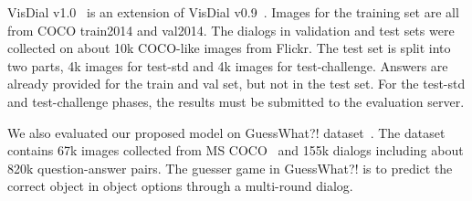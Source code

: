 \documentclass[10pt,twocolumn,letterpaper]{article}
\begin{document}
VisDial v1.0~\cite{das2017visual} is an extension of VisDial v0.9~\cite{das2017visual}. Images for the training set are all from COCO train2014 and val2014. The dialogs in validation and test sets were collected on about 10k COCO-like images from Flickr. The test set is split into two parts, 4k images for test-std and 4k images for test-challenge. Answers are already provided for the train and val set, but not in the test set. For the test-std and test-challenge phases, the results must be submitted to the evaluation server. 

We also evaluated our proposed model on GuessWhat?! dataset~\cite{de2017guesswhat}. The dataset contains 67k images collected from MS COCO~\cite{lin2014microsoft} and 155k dialogs including about 820k question-answer pairs. The guesser game in GuessWhat?! is to predict the correct object in object options through a multi-round dialog.
\end{document}
